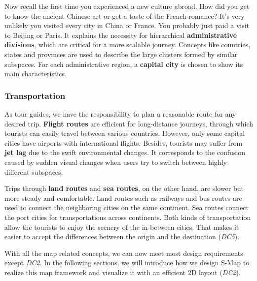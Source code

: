 Now recall the first time you experienced a new culture abroad. How did you get to know the ancient Chinese art or get a taste of the French romance? It's very unlikely you visited every city in China or France. You probably just paid a visit to Beijing or Paris. It explains the necessity for hierarchical \textbf{administrative divisions}, which are critical for a more scalable journey. Concepts like countries, states and provinces are used to describe the large clusters formed by similar subspaces. For each administrative region, a \textbf{capital city} is chosen to show its main characteristics.

\subsubsection{Transportation}

As tour guides, we have the responsibility to plan a reasonable route for any desired trip. \textbf{Flight routes} are efficient for long-distance journeys, through which tourists can easily travel between various countries. However, only some capital cities have airports with international flights. Besides, tourists may suffer from \textbf{jet lag} due to the swift environmental changes. It corresponds to the confusion caused by sudden visual changes when users try to switch between highly different subspaces.

Trips through \textbf{land routes} and \textbf{sea routes}, on the other hand, are slower but more steady and comfortable. Land routes such as railways and bus routes are used to connect the neighboring cities on the same continent. Sea routes connect the port cities for transportations across continents. Both kinds of transportation allow the tourists to enjoy the scenery of the in-between cities. That makes it easier to accept the differences between the origin and the destination (\textit{DC5}).

With all the map related concepts, we can now meet most design requirements except \textit{DC2}. In the following sections, we will introduce how we design S-Map to realize this map framework and visualize it with an efficient 2D layout (\textit{DC2}).